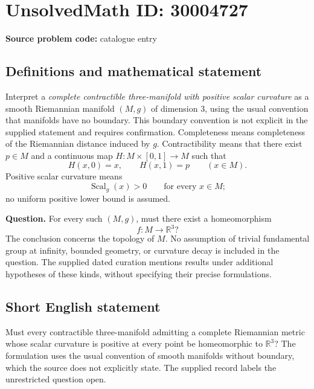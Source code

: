 \documentclass[11pt]{article}
\newcommand{\R}{\mathbb{R}}
\begin{document}
\section*{UnsolvedMath ID: 30004727}
\textbf{Source problem code:} catalogue entry
\subsection{Definitions and mathematical statement}
Interpret a \emph{complete contractible three-manifold with positive scalar curvature} as a smooth Riemannian manifold \((M,g)\) of dimension \(3\), using the usual convention that manifolds have no boundary. This boundary convention is not explicit in the supplied statement and requires confirmation. Completeness means completeness of the Riemannian distance induced by \(g\). Contractibility means that there exist \(p\in M\) and a continuous map \(H:M\times[0,1]\to M\) such that
\[
H(x,0)=x,\qquad H(x,1)=p\qquad(x\in M).
\]
Positive scalar curvature means
\[
\operatorname{Scal}_g(x)>0\qquad\text{for every }x\in M;
\]
no uniform positive lower bound is assumed.

\textbf{Question.} For every such \((M,g)\), must there exist a homeomorphism
\[
f:M\longrightarrow\R^3?
\]
The conclusion concerns the topology of \(M\). No assumption of trivial fundamental group at infinity, bounded geometry, or curvature decay is included in the question. The supplied dated curation mentions results under additional hypotheses of these kinds, without specifying their precise formulations.
\subsection{Short English statement}
Must every contractible three-manifold admitting a complete Riemannian metric whose scalar curvature is positive at every point be homeomorphic to \(\R^3\)? The formulation uses the usual convention of smooth manifolds without boundary, which the source does not explicitly state. The supplied record labels the unrestricted question open.
\end{document}
